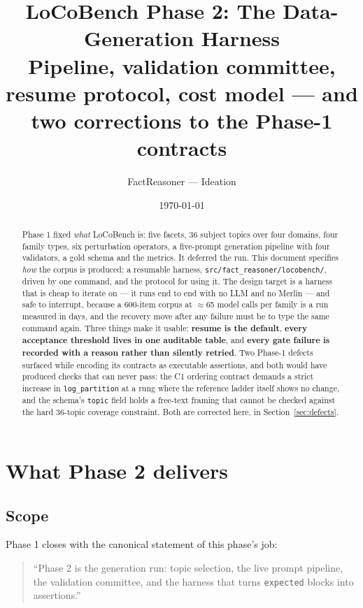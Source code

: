 \documentclass[11pt]{article}
\title{LoCoBench Phase 2: The Data-Generation Harness\\
       \large Pipeline, validation committee, resume protocol, cost model
       --- and two corrections to the Phase-1 contracts}
\author{FactReasoner --- Ideation}
\date{\today}
\newcommand{\readout}[1]{\texttt{#1}}
\newcommand{\pymod}[1]{\texttt{#1}}
\begin{document}
\maketitle

\begin{abstract}\noindent
Phase 1 fixed \emph{what} LoCoBench is: five facets, 36 subject topics over four domains, four
family types, six perturbation operators, a five-prompt generation pipeline with four validators,
a gold schema and the metrics. It deferred the run. This document specifies \emph{how} the corpus
is produced: a resumable harness, \pymod{src/fact\_reasoner/locobench/}, driven by one command, and
the protocol for using it. The design target is a harness that is cheap to iterate on --- it runs
end to end with no LLM and no Merlin --- and safe to interrupt, because a 600-item corpus at
$\approx$65 model calls per family is a run measured in days, and the recovery move after any
failure must be to type the same command again. Three things make it usable: \textbf{resume is the
default}, \textbf{every acceptance threshold lives in one auditable table}, and \textbf{every gate
failure is recorded with a reason rather than silently retried}. Two Phase-1 defects surfaced while
encoding its contracts as executable assertions, and both would have produced checks that can
never pass: the C1 ordering contract demands a strict increase in \readout{log\_partition} at a rung
where the reference ladder itself shows no change, and the schema's \texttt{topic} field holds a
free-text framing that cannot be checked against the hard 36-topic coverage constraint. Both are
corrected here, in Section~\ref{sec:defects}.
\end{abstract}

\tableofcontents

\section{What Phase 2 delivers}
\label{sec:scope}

\subsection{Scope}

Phase 1 closes with the canonical statement of this phase's job:

\begin{quote}
``Phase 2 is the generation run: topic selection, the live prompt pipeline, the validation
committee, and the harness that turns \texttt{expected} blocks into assertions.''
\end{quote}
\end{document}

